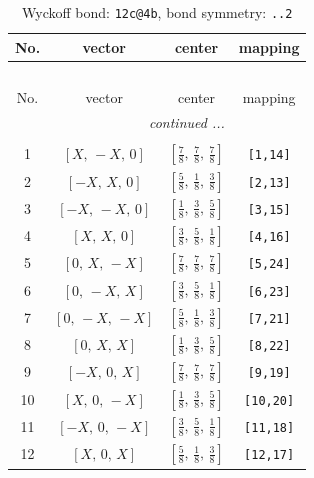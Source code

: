 \documentclass[fleqn,8pt]{jsarticle}
\begin{document}
\renewcommand{\arraystretch}{1.2}
\begin{longtable}{cccc}
\caption{Wyckoff bond: {\tt 12c@4b}, bond symmetry: {\tt ..2}}
 \\
 \hline \hline
No. & vector & center & mapping \\ \hline \endfirsthead

\multicolumn{3}{l}{\tablename\ \thetable{}} \\
 \hline \hline
No. & vector & center & mapping \\ \hline \endhead

 \hline \hline
\multicolumn{3}{r}{\footnotesize\it continued ...} \\ \endfoot

 \hline \hline
\multicolumn{3}{r}{} \\ \endlastfoot

1 & $\left[ X,\, - X,\, 0 \right]$ & $\left[ \frac{7}{8},\, \frac{7}{8},\, \frac{7}{8} \right]$ & {\tt [1,14]} \\ \hline
2 & $\left[ - X,\, X,\, 0 \right]$ & $\left[ \frac{5}{8},\, \frac{1}{8},\, \frac{3}{8} \right]$ & {\tt [2,13]} \\ \hline
3 & $\left[ - X,\, - X,\, 0 \right]$ & $\left[ \frac{1}{8},\, \frac{3}{8},\, \frac{5}{8} \right]$ & {\tt [3,15]} \\ \hline
4 & $\left[ X,\, X,\, 0 \right]$ & $\left[ \frac{3}{8},\, \frac{5}{8},\, \frac{1}{8} \right]$ & {\tt [4,16]} \\ \hline
5 & $\left[ 0,\, X,\, - X \right]$ & $\left[ \frac{7}{8},\, \frac{7}{8},\, \frac{7}{8} \right]$ & {\tt [5,24]} \\ \hline
6 & $\left[ 0,\, - X,\, X \right]$ & $\left[ \frac{3}{8},\, \frac{5}{8},\, \frac{1}{8} \right]$ & {\tt [6,23]} \\ \hline
7 & $\left[ 0,\, - X,\, - X \right]$ & $\left[ \frac{5}{8},\, \frac{1}{8},\, \frac{3}{8} \right]$ & {\tt [7,21]} \\ \hline
8 & $\left[ 0,\, X,\, X \right]$ & $\left[ \frac{1}{8},\, \frac{3}{8},\, \frac{5}{8} \right]$ & {\tt [8,22]} \\ \hline
9 & $\left[ - X,\, 0,\, X \right]$ & $\left[ \frac{7}{8},\, \frac{7}{8},\, \frac{7}{8} \right]$ & {\tt [9,19]} \\ \hline
10 & $\left[ X,\, 0,\, - X \right]$ & $\left[ \frac{1}{8},\, \frac{3}{8},\, \frac{5}{8} \right]$ & {\tt [10,20]} \\ \hline
11 & $\left[ - X,\, 0,\, - X \right]$ & $\left[ \frac{3}{8},\, \frac{5}{8},\, \frac{1}{8} \right]$ & {\tt [11,18]} \\ \hline
12 & $\left[ X,\, 0,\, X \right]$ & $\left[ \frac{5}{8},\, \frac{1}{8},\, \frac{3}{8} \right]$ & {\tt [12,17]} \\
\end{longtable}
\end{document}
